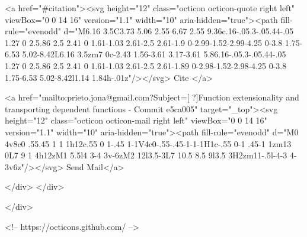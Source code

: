       <a  href="#citation"><svg height="12" class="octicon octicon-quote right left" viewBox="0 0 14 16" version="1.1" width="10" aria-hidden="true"><path fill-rule="evenodd" d="M6.16 3.5C3.73 5.06 2.55 6.67 2.55 9.36c.16-.05.3-.05.44-.05 1.27 0 2.5.86 2.5 2.41 0 1.61-1.03 2.61-2.5 2.61-1.9 0-2.99-1.52-2.99-4.25 0-3.8 1.75-6.53 5.02-8.42L6.16 3.5zm7 0c-2.43 1.56-3.61 3.17-3.61 5.86.16-.05.3-.05.44-.05 1.27 0 2.5.86 2.5 2.41 0 1.61-1.03 2.61-2.5 2.61-1.89 0-2.98-1.52-2.98-4.25 0-3.8 1.75-6.53 5.02-8.42l1.14 1.84h-.01z"/></svg> Cite
      </a>

      <a href="mailto:prieto.jona@gmail.com?Subject=[ ?]Function extensionality and transporting dependent functions  - Commit e5ca005" target="_top"><svg height="12" class="octicon octicon-mail right left" viewBox="0 0 14 16" version="1.1" width="10" aria-hidden="true"><path fill-rule="evenodd" d="M0 4v8c0 .55.45 1 1 1h12c.55 0 1-.45 1-1V4c0-.55-.45-1-1-1H1c-.55 0-1 .45-1 1zm13 0L7 9 1 4h12zM1 5.5l4 3-4 3v-6zM2 12l3.5-3L7 10.5 8.5 9l3.5 3H2zm11-.5l-4-3 4-3v6z"/></svg> Send Mail</a>

    </div>
  </div>

</div>

<!-- https://octicons.github.com/ -->





